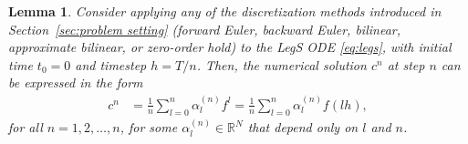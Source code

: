 \documentclass{article}
\newtheorem{lemma}{Lemma}
\theoremstyle{definition}
\begin{document}

\begin{lemma} \label{lem:numsol_linear}
Consider applying any of the discretization  methods introduced in Section~\ref{sec:problem setting}
    (forward Euler, backward Euler, bilinear, approximate bilinear, or zero-order hold)
    to the LegS ODE \eqref{eq:legs}, with initial time $t_0=0$ and timestep $h = T/n$. 
    Then, the numerical solution $c^n$ at step $n$ can be expressed in the form
    \begin{align*}
        c^n &= \frac{1}{n} \sum_{l=0}^n \alpha^{(n)}_l f^l = \frac{1}{n} \sum_{l=0}^n \alpha^{(n)}_l f(lh),
    \end{align*}
    for all $n = 1, 2, \dots, n$, for some $\alpha^{(n)}_l \in \mathbb{R}^N$ that depend only on $l$ and $n$.
\end{lemma}
\end{document}
